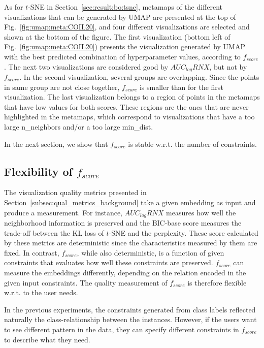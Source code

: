 As for $t$-SNE in Section~\ref{sec:result:bo:tsne}, metamaps of the different visualizations that can be generated by UMAP are presented at the top of Fig.~\ref{fig:umap:meta:COIL20}, and four different visualizations are selected and shown at the bottom of the figure.
The first visualization (bottom left of Fig.~\ref{fig:umap:meta:COIL20}) presents the visualization generated by UMAP with the best predicted combination of hyperparameter values, according to $f_{score}$.
The next two visualizations are considered good by $AUC_{log}RNX$, but not by $f_{score}$.
In the second visualization, several groups are overlapping. Since the points in same group are not close together, $f_{score}$ is smaller than for the first visualization.
The last visualization belongs to a region of points in the metamaps that have low values for both scores.
These regions are the ones that are never highlighted in the metamaps, which correspond to visualizations that have a too large {n\_neighbors} and/or a too large {min\_dist}. 

In the next section, we show that $f_{score}$ is stable w.r.t. the number of constraints.

\subsection{Flexibility of $f_{score}$}\label{sec:result:flexibility}
The visualization quality metrics presented in Section~\ref{subsec:qual_metrics_background} take a given embedding as input and produce a measurement.
For instance, $AUC_{log}RNX$ measures how well the neighborhood information is preserved and the BIC-base score measures the trade-off between the KL loss of $t$-SNE and the perplexity.
These score calculated by these metrics are deterministic since the characteristics measured by them are fixed.
In contrast, $f_{score}$, while also deterministic, is a function of given constraints that evaluates how well these constraints are preserved.
$f_{score}$ can measure the embeddings differently, depending on the relation encoded in the given input constraints. The quality measurement of $f_{score}$ is therefore flexible w.r.t. to the user needs.

In the previous experiments, the constraints generated from class labels reflected naturally the class-relationship between the instances.
However, if the users want to see different pattern in the data, they can specify different constraints in $f_{score}$ to describe what they need.

